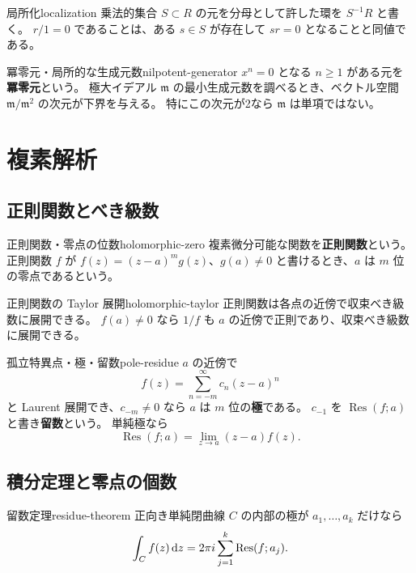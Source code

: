 \begin{definition}{局所化}{localization}
乗法的集合 $S\subset R$ の元を分母として許した環を $S^{-1}R$ と書く。
$r/1=0$ であることは、ある $s\in S$ が存在して $sr=0$ となることと同値である。
\end{definition}

\begin{definition}{冪零元・局所的な生成元数}{nilpotent-generator}
$x^n=0$ となる $n\ge1$ がある元を\textbf{冪零元}という。
極大イデアル $\mathfrak m$ の最小生成元数を調べるとき、ベクトル空間 $\mathfrak m/\mathfrak m^2$ の次元が下界を与える。
特にこの次元が2なら $\mathfrak m$ は単項ではない。
\end{definition}

\chapter{複素解析}
\label{ch:complex}

\section{正則関数とべき級数}

\begin{definition}{正則関数・零点の位数}{holomorphic-zero}
複素微分可能な関数を\textbf{正則関数}という。
正則関数 $f$ が
$f(z)=(z-a)^m g(z)$、$g(a)\ne0$ と書けるとき、$a$ は $m$ 位の零点であるという。
\end{definition}

\begin{theorem}{正則関数の Taylor 展開}{holomorphic-taylor}
正則関数は各点の近傍で収束べき級数に展開できる。
$f(a)\ne0$ なら $1/f$ も $a$ の近傍で正則であり、収束べき級数に展開できる。
\end{theorem}

\begin{definition}{孤立特異点・極・留数}{pole-residue}
$a$ の近傍で
\[
 f(z)=\sum_{n=-m}^{\infty}c_n(z-a)^n
\]
と Laurent 展開でき、$c_{-m}\ne0$ なら $a$ は $m$ 位の\textbf{極}である。
$c_{-1}$ を $\operatorname{Res}(f;a)$ と書き\textbf{留数}という。
単純極なら
\[
 \operatorname{Res}(f;a)=\lim_{z\to a}(z-a)f(z).
\]
\end{definition}

\section{積分定理と零点の個数}

\begin{theorem}{留数定理}{residue-theorem}
正向き単純閉曲線 $C$ の内部の極が $a_1,\ldots,a_k$ だけなら
\[
 \int_C f(z)\,\mathrm{d} z=2\pi i\sum_{j=1}^k\operatorname{Res}(f;a_j).
\]
\end{theorem}

